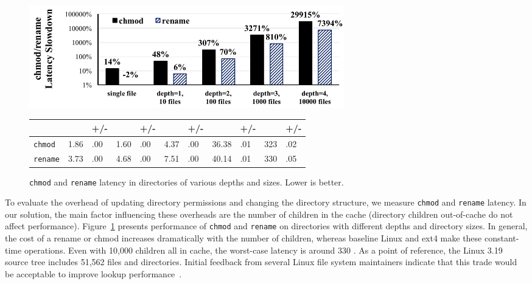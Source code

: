 \begin{figure}[t!]
\footnotesize
\centering
\begin{minipage}{5.3in}
\raggedleft
\includegraphics[width=5.4in]{dcache/plots/lm_chmod_rename.pdf}
{\setlength{\tabcolsep}{3pt}
\begin{tabular}{|l|R{.4in}R{.24in}|R{.4in}R{.24in}|R{.4in}R{.24in}|R{.4in}R{.24in}|R{.4in}R{.24in}|}
\hline
 & \us{} & +/- & \us{} & +/- & \us{} & +/- & \us{} & +/- & \us{} & +/- \\
\hline
{\tt chmod}  & 1.86 & .00 & 1.60 & .00 & 4.37 & .00 & 36.38 & .01 & 323 & .02 \\
\hline
{\tt rename} & 3.73 & .00 & 4.68 & .00 & 7.51 & .00 & 40.14 & .01 & 330 & .05 \\
\hline
\end{tabular}}
\end{minipage}
\caption[Overhead of the {\tt chmod} and {\tt rename} latency in the optimized directory cache]
{{\tt chmod} and {\tt rename} latency in directories of various depths and sizes. Lower is better.}
\label{fig:dcache:chmod-rename}
\end{figure}

To evaluate the overhead of updating directory permissions and changing the directory structure,
we measure {\tt chmod} and {\tt rename} latency.
In our solution, the main factor influencing these overheads are the number of children
in the cache (directory children out-of-cache do not affect performance).
Figure~\ref{fig:dcache:chmod-rename} presents
performance of {\tt chmod} and {\tt rename}  on directories with different depths and directory sizes.
In general, the cost of a rename or chmod increases dramatically with the number of children,
whereas baseline Linux and ext4 make these constant-time operations.
Even with 10,000 children all in cache, the worst-case latency is around 330 \us{}.
As a point of reference, the Linux 3.19 source tree includes 51,562 files and directories.
Initial feedback from several Linux file system maintainers indicate that this trade would be acceptable
to improve lookup performance~\citep{linux-forum15}.

